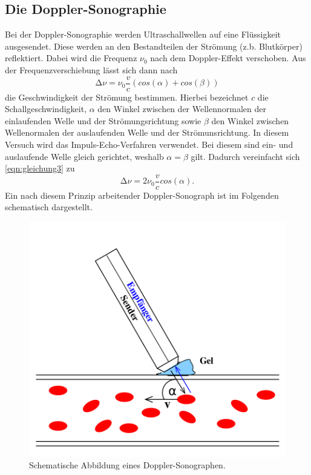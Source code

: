 \subsection{Die Doppler-Sonographie}
Bei der Doppler-Sonographie werden Ultraschallwellen auf eine Flüssigkeit
ausgesendet. Diese werden an den Bestandteilen der Strömung (z.b. Blutkörper)
reflektiert. Dabei wird die Frequenz $\nu_0$ nach dem Doppler-Effekt verschoben.
Aus der Frequenzverschiebung lässt sich dann nach
\begin{equation}
\increment \nu = \nu_0 \frac{v}{c}(cos(\alpha) + cos(\beta))
\label{eqn:gleichung3}
\end{equation}
die Geschwindigkeit der Strömung bestimmen.
Hierbei bezeichnet $c$ die Schallgeschwindigkeit, $\alpha$ den Winkel zwischen der
Wellennormalen der einlaufenden Welle und der Strömungsrichtung sowie $\beta$ den
Winkel zwischen Wellenormalen der auslaufenden Welle und der Strömunsrichtung.
In diesem Versuch wird das Impuls-Echo-Verfahren verwendet. Bei diesem sind ein-
und auslaufende Welle gleich gerichtet, weshalb $\alpha = \beta$ gilt. Dadurch
vereinfacht sich \eqref{eqn:gleichung3} zu
\begin{equation*}
\increment \nu = 2 \nu_0 \frac{v}{c} cos(\alpha).
\end{equation*}
Ein nach diesem Prinzip arbeitender Doppler-Sonograph ist im Folgenden schematisch
dargestellt.
\begin{figure}
  \centering
  \includegraphics[scale=0.5]{content/dopplersonograph.png}
  \caption{Schematische Abbildung eines Doppler-Sonographen.}
  \label{fig:dopplersonographtheorie}
\end{figure}

